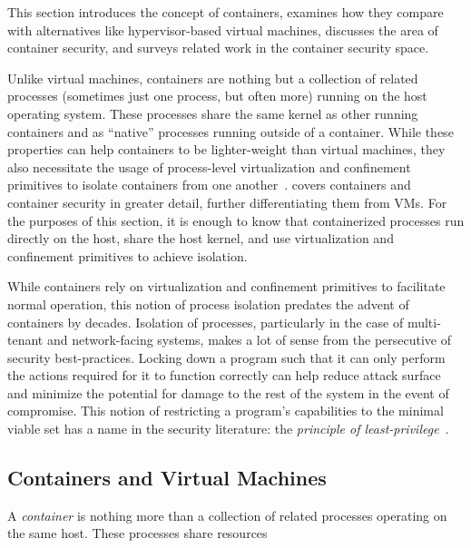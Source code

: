 This section introduces the concept of containers, examines how they compare with
alternatives like hypervisor-based virtual machines, discusses the area of container
security, and surveys related work in the container security space.

\begin{inprogress}
Unlike virtual machines, containers are nothing but a collection of related processes
(sometimes just one process, but often more) running on the host operating system. These
processes share the same kernel as other running containers and as \enquote{native}
processes running outside of a container. While these properties can help containers to be
lighter-weight than virtual machines, they also necessitate the usage of process-level
virtualization and confinement primitives to isolate containers from one
another~\cite{sultan2019_container_security}.   covers
containers and container security in greater detail, further differentiating them from
VMs. For the purposes of this section, it is enough to know that containerized processes
run directly on the host, share the host kernel, and use virtualization and confinement
primitives to achieve isolation.

While containers rely on virtualization and confinement primitives to facilitate normal
operation, this notion of process isolation predates the advent of containers by decades.
Isolation of processes, particularly in the case of multi-tenant and network-facing
systems, makes a lot of sense from the persecutive of security best-practices. Locking
down a program such that it can only perform the actions required for it to function
correctly can help reduce attack surface and minimize the potential for damage to the rest
of the system in the event of compromise. This notion of restricting a program's
capabilities to the minimal viable set has a name in the security literature: the
\textit{principle of least-privilege}~\cite{schneider03_least_privilege,
van_oorschot2020_tools_jewels}.
\end{inprogress}

\subsection{Containers and Virtual Machines}%
\label{ss:containers-bg}

A \textit{container} is nothing more than a collection of related processes operating on
the same host. These processes share resources

